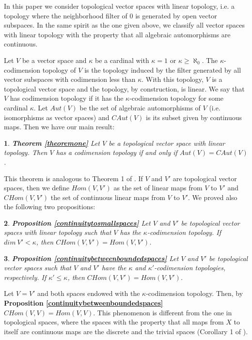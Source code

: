 \documentclass[a4paper,12pt]{article}
\theoremstyle{bloco}
\newtheorem{bloco}{}
\begin{document}
In this paper we consider topological vector spaces with linear topology, i.e. a topology where the neighborhood filter of $0$ is generated by open vector subspaces. In the same spirit as the one given above, we classify all vector spaces with linear topology with the property that all algebraic automorphisms are continuous.

Let $V$ be a vector space and $\kappa$ be a cardinal with $\kappa = 1$ or $\kappa \geqslant \aleph_{0}$. The $\kappa$-codimension topology of $V$ is the topology induced by the filter generated by all vector subspaces with codimension less than $\kappa$. With this topology, $V$ is a topological vector space and the topology, by construction, is linear. We say that $V$ has codimension topology if it has the $\kappa$-codimension topology for some cardinal $\kappa$. Let $Aut(V)$ be the set of algebraic automorphisms of $V$ (i.e. isomorphisms as vector spaces) and $CAut(V)$ is its subset given by continuous maps. Then we have our main result:

\begin{bloco}{\textbf{Theorem \ref{theoremone}}} \textit{Let $V$ be a topological vector space with linear topology. Then $V$ has a codimension topology if and only if $Aut(V) = CAut(V)$.  }
\end{bloco}

This theorem is analogous to Theorem 1 of \cite{So9}. If $V$ and $V'$ are topological vector spaces, then we define $Hom(V,V')$ as the set of linear maps from $V$ to $V'$ and $CHom(V,V')$ the set of continuous linear maps from $V$ to $V'$. We proved also the following two propositions:

\begin{bloco}{\textbf{Proposition \ref{continuitytosmallspaces}}} \textit{Let $V$ and $V'$ be topological vector spaces with linear topology such that $V$ has the $\kappa$-codimension topology. If $dim \ V' < \kappa$, then
$CHom(V,V') = Hom(V,V')$.}    
\end{bloco}

\begin{bloco}{\textbf{Proposition \ref{continuitybetweenboundedspaces}}} \textit{Let $V$ and $V'$ be topological vector spaces such that $V$ and $V'$ have the $\kappa$ and $\kappa'$-codimension topologies, respectively. If $\kappa' \leqslant \kappa$, then $CHom(V,V') = Hom(V,V')$.} 
\end{bloco}

Let $V = V'$ and both spaces endowed with the $\kappa$-codimension topology. Then, by \textbf{Proposition \ref{continuitybetweenboundedspaces}} $CHom(V,V) = Hom(V,V)$. This phenomenon is different from the one in topological spaces, where the spaces with the property that all maps from $X$ to itself are continuous maps are the discrete and the trivial spaces (Corollary 1 of \cite{So9}). 
\end{document}
